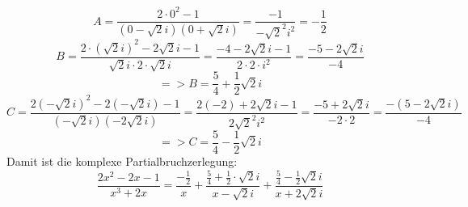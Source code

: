 \documentclass[11pt]{article}
\begin{document}
				$$A=\frac{2 \cdot 0^2-1}{(0-\sqrt{2}i)(0+\sqrt{2}i)}=\frac{-1}{-\sqrt{2}^2i^2}=-\frac{1}{2}$$
				$$B=\frac{2 \cdot (\sqrt{2}i)^2-2\sqrt{2}i-1}{\sqrt{2}i \cdot 2 \cdot \sqrt{2}i}=\frac{-4-2\sqrt{2}i-1}{2 \cdot 2 \cdot i^2}=\frac{-5-2\sqrt{2}i}{-4}$$
				$$=>B=\frac{5}{4}+\frac{1}{2}\sqrt{2}i$$
				$$C=\frac{2(-\sqrt{2}i)^2-2(-\sqrt{2}i)-1}{(-\sqrt{2}i)(-2\sqrt{2}i)}=\frac{2(-2)+2\sqrt{2}i-1}{2\sqrt{2}^2i^2}=\frac{-5+2\sqrt{2}i}{-2 \cdot 2}=\frac{-(5-2\sqrt{2}i)}{-4}$$
				$$=>C=\frac{5}{4}-\frac{1}{2}\sqrt{2}i$$
				Damit ist die komplexe Partialbruchzerlegung:\\
				$$\frac{2x^2-2x-1}{x^3+2x}=\frac{-\frac{1}{2}}{x}+\frac{\frac{5}{4}+\frac{1}{2} \cdot \sqrt{2}i}{x-\sqrt{2}i}+\frac{\frac{5}{4}-\frac{1}{2}\sqrt{2}i}{x+2\sqrt{2}i}$$
\end{document}
